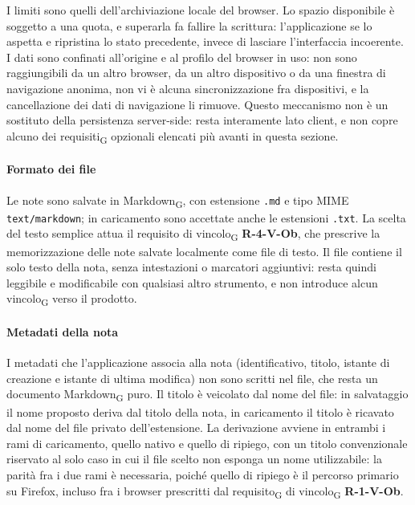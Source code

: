 \documentclass[a4paper, 10pt]{article}
\begin{document}
I limiti sono quelli dell'archiviazione locale del browser. Lo spazio disponibile è soggetto a una quota, e superarla fa fallire la scrittura: l'applicazione se lo aspetta e ripristina lo stato precedente, invece di lasciare l'interfaccia incoerente. I dati sono confinati all'origine e al profilo del browser in uso: non sono raggiungibili da un altro browser, da un altro dispositivo o da una finestra di navigazione anonima, non vi è alcuna sincronizzazione fra dispositivi, e la cancellazione dei dati di navigazione li rimuove. Questo meccanismo non è un sostituto della persistenza server-side: resta interamente lato client, e non copre alcuno dei requisiti\textsubscript{G} opzionali elencati più avanti in questa sezione.

\paragraph{Formato dei file}
Le note sono salvate in Markdown\textsubscript{G}, con estensione \texttt{.md} e tipo MIME \texttt{text/markdown}; in caricamento sono accettate anche le estensioni \texttt{.txt}. La scelta del testo semplice attua il requisito di vincolo\textsubscript{G} \textbf{R-4-V-Ob}, che prescrive la memorizzazione delle note salvate localmente come file di testo. Il file contiene il solo testo della nota, senza intestazioni o marcatori aggiuntivi: resta quindi leggibile e modificabile con qualsiasi altro strumento, e non introduce alcun vincolo\textsubscript{G} verso il prodotto.

\paragraph{Metadati della nota}
I metadati che l'applicazione associa alla nota (identificativo, titolo, istante di creazione e istante di ultima modifica) non sono scritti nel file, che resta un documento Markdown\textsubscript{G} puro. Il titolo è veicolato dal nome del file: in salvataggio il nome proposto deriva dal titolo della nota, in caricamento il titolo è ricavato dal nome del file privato dell'estensione. La derivazione avviene in entrambi i rami di caricamento, quello nativo e quello di ripiego, con un titolo convenzionale riservato al solo caso in cui il file scelto non esponga un nome utilizzabile: la parità fra i due rami è necessaria, poiché quello di ripiego è il percorso primario su Firefox, incluso fra i browser prescritti dal requisito\textsubscript{G} di vincolo\textsubscript{G} \textbf{R-1-V-Ob}.
\end{document}
